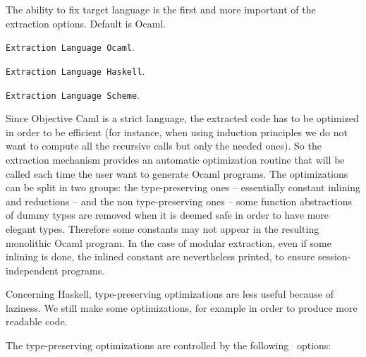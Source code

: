 

The ability to fix target language is the first and more important
of the extraction options. Default is Ocaml.
\begin{description}
\item {\tt Extraction Language Ocaml}.
\item {\tt Extraction Language Haskell}.
\item {\tt Extraction Language Scheme}.
\end{description}


Since Objective Caml is a strict language, the extracted code has to
be optimized in order to be efficient (for instance, when using
induction principles we do not want to compute all the recursive calls
but only the needed ones). So the extraction mechanism provides an
automatic optimization routine that will be called each time the user
want to generate Ocaml programs. The optimizations can be split in two
groups: the type-preserving ones -- essentially constant inlining and
reductions -- and the non type-preserving ones -- some function
abstractions of dummy types are removed when it is deemed safe in order
to have more elegant types. Therefore some constants may not appear in the
resulting monolithic Ocaml program. In the case of modular extraction,
even if some inlining is done, the inlined constant are nevertheless
printed, to ensure session-independent programs.

Concerning Haskell, type-preserving optimizations are less useful
because of laziness. We still make some optimizations, for example in
order to produce more readable code.

The type-preserving optimizations are controlled by the following \Coq\ options:

